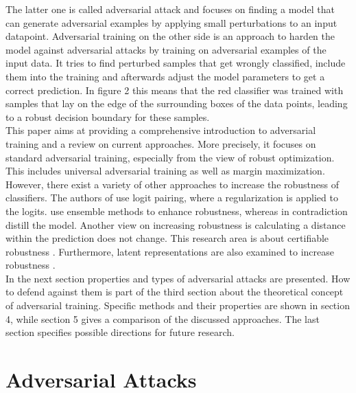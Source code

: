 \documentclass[conference]{IEEEtran}
\begin{document}
The latter one is called adversarial attack and focuses on finding a model that can generate adversarial examples by applying small perturbations to an input datapoint. Adversarial training on the other side is an approach to harden the model against adversarial attacks by training on adversarial examples of the input data. It tries to find perturbed samples that get wrongly classified, include them into the training and afterwards adjust the model parameters to get a correct prediction. In figure 2 this means that the red classifier was trained with samples that lay on the edge of the surrounding boxes of the data points, leading to a robust decision boundary for these samples. \\
This paper aims at providing a comprehensive introduction to adversarial training and a review on current approaches. More precisely, it focuses on standard adversarial training, especially from the view of robust optimization. This includes universal adversarial training as well as margin maximization. However, there exist a variety of other approaches to increase the robustness of classifiers. The authors of \cite{b19, b20} use logit pairing, where a regularization is applied to the logits. \cite{b23} use ensemble methods to enhance robustness, whereas \cite{b21, b22} in contradiction distill the model. Another view on increasing robustness is calculating a distance within the prediction does not change. This research area is about certifiable robustness \cite{b30}. Furthermore, latent representations are also examined to increase robustness \cite{b31}. \\
In the next section properties and types of adversarial attacks are presented. How to defend against them is part of the third section about the theoretical concept of adversarial training. Specific methods and their properties are shown in section 4, while section 5 gives a comparison of the discussed approaches. The last section specifies possible directions for future research.

\section{Adversarial Attacks}
\end{document}
